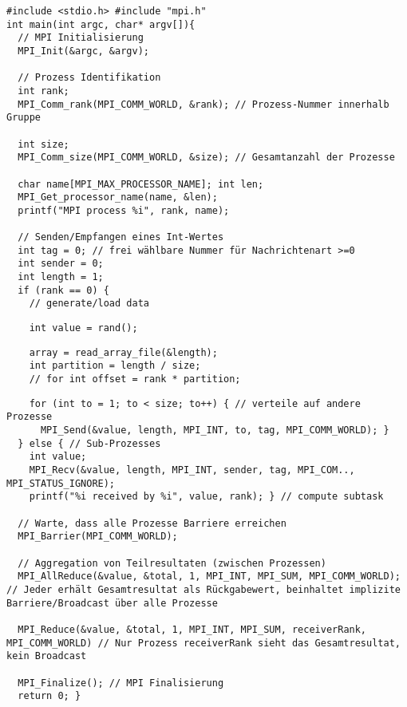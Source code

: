 \begin{lstlisting}
#include <stdio.h> #include "mpi.h"
int main(int argc, char* argv[]){
  // MPI Initialisierung
  MPI_Init(&argc, &argv);

  // Prozess Identifikation
  int rank;
  MPI_Comm_rank(MPI_COMM_WORLD, &rank); // Prozess-Nummer innerhalb Gruppe

  int size;
  MPI_Comm_size(MPI_COMM_WORLD, &size); // Gesamtanzahl der Prozesse

  char name[MPI_MAX_PROCESSOR_NAME]; int len;
  MPI_Get_processor_name(name, &len);
  printf("MPI process %i", rank, name);

  // Senden/Empfangen eines Int-Wertes
  int tag = 0; // frei wählbare Nummer für Nachrichtenart >=0
  int sender = 0;
  int length = 1;
  if (rank == 0) {
    // generate/load data
\end{lstlisting}
\begin{minipage}[t]{0.5\linewidth}
    \begin{lstlisting}
    int value = rand();
    \end{lstlisting}
\end{minipage}
\begin{minipage}[t]{0.5\linewidth}
    \begin{lstlisting}
    array = read_array_file(&length);
    int partition = length / size;
    // for int offset = rank * partition;
    \end{lstlisting}
\end{minipage}
\begin{lstlisting}
    for (int to = 1; to < size; to++) { // verteile auf andere Prozesse
      MPI_Send(&value, length, MPI_INT, to, tag, MPI_COMM_WORLD); }
  } else { // Sub-Prozesses
    int value;
    MPI_Recv(&value, length, MPI_INT, sender, tag, MPI_COM.., MPI_STATUS_IGNORE);
    printf("%i received by %i", value, rank); } // compute subtask

  // Warte, dass alle Prozesse Barriere erreichen
  MPI_Barrier(MPI_COMM_WORLD);

  // Aggregation von Teilresultaten (zwischen Prozessen)
  MPI_AllReduce(&value, &total, 1, MPI_INT, MPI_SUM, MPI_COMM_WORLD); // Jeder erhält Gesamtresultat als Rückgabewert, beinhaltet implizite Barriere/Broadcast über alle Prozesse

  MPI_Reduce(&value, &total, 1, MPI_INT, MPI_SUM, receiverRank, MPI_COMM_WORLD) // Nur Prozess receiverRank sieht das Gesamtresultat, kein Broadcast

  MPI_Finalize(); // MPI Finalisierung
  return 0; }
\end{lstlisting}


